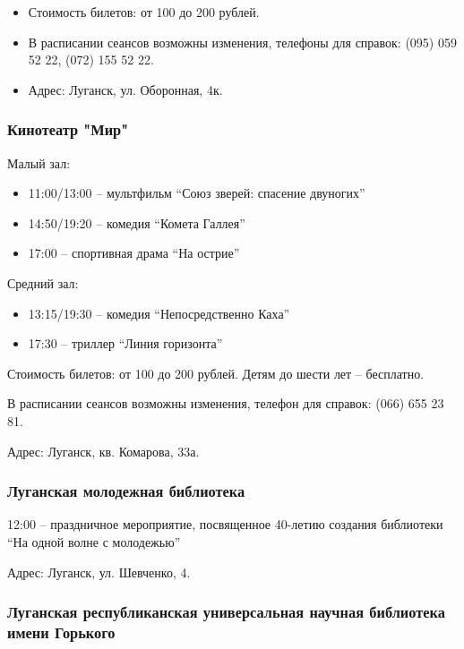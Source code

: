 \begin{itemize}
  \item Стоимость билетов: от 100 до 200 рублей.
  \item В расписании сеансов возможны изменения, телефоны для справок: (095) 059 52 22, (072) 155 52 22.
  \item Адрес: Луганск, ул. Оборонная, 4к.
\end{itemize}

\subsubsection{Кинотеатр "Мир"}

Малый зал:

\begin{itemize}
  \item 11:00/13:00 – мультфильм \enquote{Союз зверей: спасение двуногих}
  \item 14:50/19:20 – комедия \enquote{Комета Галлея}
  \item 17:00 – спортивная драма \enquote{На острие}
\end{itemize}

Средний зал:

\begin{itemize}
  \item 13:15/19:30 – комедия \enquote{Непосредственно Каха}
  \item 17:30 – триллер \enquote{Линия горизонта}
\end{itemize}

Стоимость билетов: от 100 до 200 рублей. Детям до шести лет – бесплатно.

В расписании сеансов возможны изменения, телефон для справок: (066) 655 23 81.

Адрес: Луганск, кв. Комарова, 33а.

\subsubsection{Луганская молодежная библиотека}

12:00 – праздничное мероприятие, посвященное 40-летию создания библиотеки \enquote{На одной волне с молодежью}

Адрес: Луганск, ул. Шевченко, 4.

\subsubsection{Луганская республиканская универсальная научная библиотека имени Горького}

